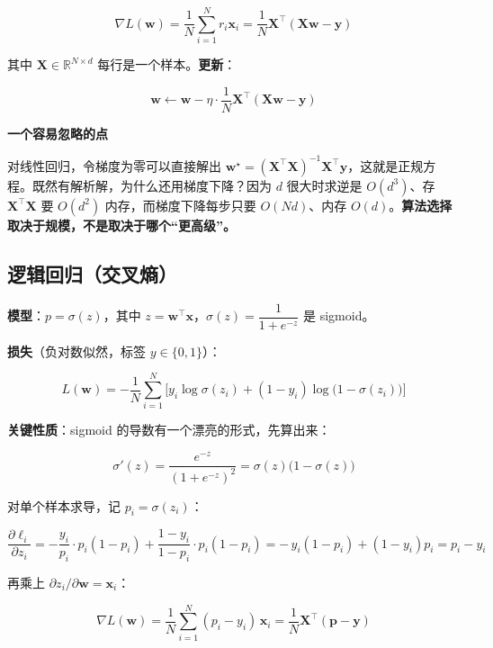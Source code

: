 \documentclass[UTF8, a4paper, zihao=-4, fontset=none]{ctexart}
\begin{document}
\[
\nabla L(\mathbf{w})=\frac{1}{N}\sum_{i=1}^{N}r_i\mathbf{x}_i=\frac{1}{N}\mathbf{X}^\top(\mathbf{X}\mathbf{w}-\mathbf{y})
\]


其中 $\mathbf{X}\in\mathbb{R}^{N\times d}$ 每行是一个样本。\textbf{更新}：


\[
\mathbf{w}\leftarrow\mathbf{w}-\eta\cdot\frac{1}{N}\mathbf{X}^\top(\mathbf{X}\mathbf{w}-\mathbf{y})
\]


\begin{infobox}
{\bfseries\sffamily\small\color{accent} 一个容易忽略的点}\par\vspace{2pt}
对线性回归，令梯度为零可以直接解出 $\mathbf{w}^\star=(\mathbf{X}^\top\mathbf{X})^{-1}\mathbf{X}^\top\mathbf{y}$，这就是正规方程。既然有解析解，为什么还用梯度下降？因为 $d$ 很大时求逆是 $O(d^3)$、存 $\mathbf{X}^\top\mathbf{X}$ 要 $O(d^2)$ 内存，而梯度下降每步只要 $O(Nd)$、内存 $O(d)$。\textbf{算法选择取决于规模，不是取决于哪个“更高级”。}


\end{infobox}




\subsection{逻辑回归（交叉熵）}



\textbf{模型}：$p=\sigma(z)$，其中 $z=\mathbf{w}^\top\mathbf{x}$，$\sigma(z)=\dfrac{1}{1+e^{-z}}$ 是 sigmoid。



\textbf{损失}（负对数似然，标签 $y\in\{0,1\}$）：


\[
L(\mathbf{w})=-\frac{1}{N}\sum_{i=1}^{N}\Big[y_i\log\sigma(z_i)+(1-y_i)\log\big(1-\sigma(z_i)\big)\Big]
\]


\textbf{关键性质}：sigmoid 的导数有一个漂亮的形式，先算出来：


\[
\sigma'(z)=\frac{e^{-z}}{(1+e^{-z})^2}=\sigma(z)\big(1-\sigma(z)\big)
\]


对单个样本求导，记 $p_i=\sigma(z_i)$：


\[
\frac{\partial \ell_i}{\partial z_i}=-\frac{y_i}{p_i}\cdot p_i(1-p_i)+\frac{1-y_i}{1-p_i}\cdot p_i(1-p_i)=-\,y_i(1-p_i)+(1-y_i)p_i=p_i-y_i
\]


再乘上 $\partial z_i/\partial\mathbf{w}=\mathbf{x}_i$：


\[
\nabla L(\mathbf{w})=\frac{1}{N}\sum_{i=1}^{N}(p_i-y_i)\,\mathbf{x}_i=\frac{1}{N}\mathbf{X}^\top(\mathbf{p}-\mathbf{y})
\]
\end{document}
